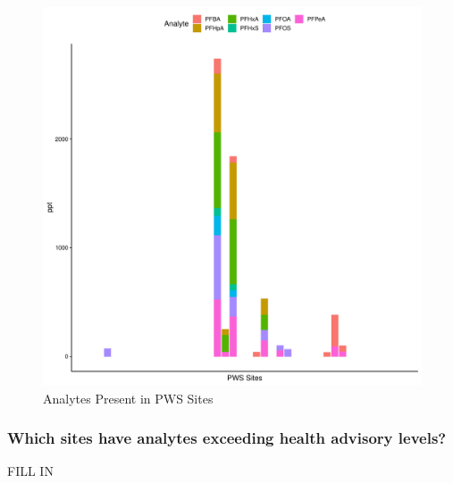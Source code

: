 \documentclass[
  12pt,
]{article}
\begin{document}
\begin{figure}

\includegraphics{PFAS_FinalProject_files/figure-latex/unnamed-chunk-14-1} \hfill{}

\caption{Analytes Present in PWS Sites}\label{fig:unnamed-chunk-14}
\end{figure}

\hypertarget{which-sites-have-analytes-exceeding-health-advisory-levels}{%
\subsubsection{Which sites have analytes exceeding health advisory
levels?}\label{which-sites-have-analytes-exceeding-health-advisory-levels}}

FILL IN
\end{document}
